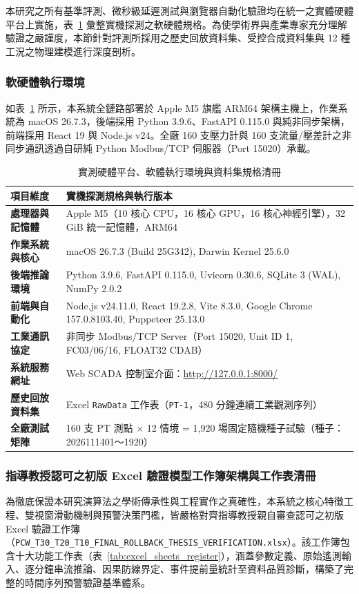 \documentclass[fontset=none, a4paper, 12pt]{ctexart}
\begin{document}
\begin{doublespace}
本研究之所有基準評測、微秒級延遲測試與瀏覽器自動化驗證均在統一之實體硬體平台上實施，表~\ref{tab:env_real} 彙整實機探測之軟硬體規格。為使學術界與產業專家充分理解驗證之嚴謹度，本節針對評測所採用之歷史回放資料集、受控合成資料集與 12 種工況之物理建模進行深度剖析。

\subsubsection{軟硬體執行環境}
如表~\ref{tab:env_real} 所示，本系統全鏈路部署於 Apple M5 旗艦 ARM64 架構主機上，作業系統為 macOS 26.7.3，後端採用 Python 3.9.6、FastAPI 0.115.0 與純非同步架構，前端採用 React 19 與 Node.js v24。全廠 160 支壓力計與 160 支流量/壓差計之非同步通訊透過自研純 Python Modbus/TCP 伺服器（Port 15020）承載。

\begin{table}[H]
\centering
\caption{實測硬體平台、軟體執行環境與資料集規格清冊}
\label{tab:env_real}
\footnotesize
\renewcommand{\arraystretch}{1.15}
\setlength{\tabcolsep}{5pt}
\begin{tabularx}{0.96\textwidth}{>{\bfseries}lX}
\toprule
項目維度 & 實機探測規格與執行版本 \\
\midrule
處理器與記憶體 & Apple M5（10 核心 CPU，16 核心 GPU，16 核心神經引擎），32 GiB 統一記憶體，ARM64 \\
作業系統與核心 & macOS 26.7.3 (Build 25G342), Darwin Kernel 25.6.0 \\
後端推論環境 & Python 3.9.6, FastAPI 0.115.0, Uvicorn 0.30.6, SQLite 3 (WAL), NumPy 2.0.2 \\
前端與自動化 & Node.js v24.11.0, React 19.2.8, Vite 8.3.0, Google Chrome 157.0.8103.40, Puppeteer 25.13.0 \\
工業通訊協定 & 非同步 Modbus/TCP Server（Port 15020, Unit ID 1, FC03/06/16, FLOAT32 CDAB） \\
系統服務網址 & Web SCADA 控制室介面：\url{http://127.0.0.1:8000/} \\
歷史回放資料集 & Excel \texttt{RawData} 工作表（\texttt{PT-1}，480 分鐘連續工業觀測序列） \\
全廠測試矩陣 & 160 支 PT 測點 $\times$ 12 情境 = 1,920 場固定隨機種子試驗（種子：2026111401～1920） \\
\bottomrule
\end{tabularx}
\end{table}

\subsubsection{指導教授認可之初版 Excel 驗證模型工作簿架構與工作表清冊}
\label{sec:excel_sheets_overview}
為徹底保證本研究演算法之學術傳承性與工程實作之真確性，本系統之核心特徵工程、雙視窗滑動機制與預警決策門檻，皆嚴格對齊指導教授親自審查認可之初版 Excel 驗證工作簿（\texttt{PCW\_T30\_T20\_T10\_FINAL\_ROLLBACK\_THESIS\_VERIFICATION.xlsx}）。該工作簿包含十大功能工作表（表~\ref{tab:excel_sheets_register}），涵蓋參數定義、原始遙測輸入、逐分鐘串流推論、因果防線界定、事件提前量統計至資料品質診斷，構築了完整的時間序列預警驗證基準體系。


\end{doublespace}
\end{document}
